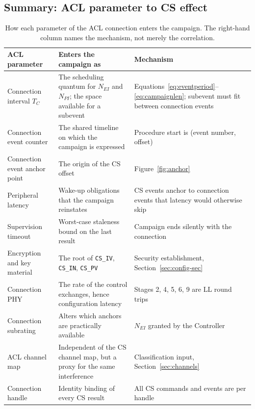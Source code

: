 \documentclass[11pt,a4paper]{article}
\newcommand{\code}[1]{\texttt{\small #1}}
\newcommand{\Tconn}{T_{C}}
\newcommand{\Nei}{N_{EI}}
\newcommand{\Npi}{N_{PI}}
\begin{document}
\subsection{Summary: ACL parameter to CS effect}

\begin{table}[htb]
\caption{How each parameter of the ACL connection enters the campaign. The right-hand column names
the mechanism, not merely the correlation.}
\label{tab:aclmap}
\centering\small
\begin{tabular}{@{}L{34mm}L{50mm}L{52mm}@{}}
\toprule
ACL parameter & Enters the campaign as & Mechanism \\
\midrule
Connection interval $\Tconn$
  & The scheduling quantum for $\Nei$ and $\Npi$; the space available for a subevent
  & Equations~\eqref{eq:eventperiod}--\eqref{eq:campaignlen}; subevent must fit between connection
    events \\
Connection event counter
  & The shared timeline on which the campaign is expressed
  & Procedure start is (event number, offset) \\
Connection event anchor point
  & The origin of the CS offset
  & Figure~\ref{fig:anchor} \\
Peripheral latency
  & Wake-up obligations that the campaign reinstates
  & CS events anchor to connection events that latency would otherwise skip \\
Supervision timeout
  & Worst-case staleness bound on the last result
  & Campaign ends silently with the connection \\
Encryption and key material
  & The root of \code{CS\_IV}, \code{CS\_IN}, \code{CS\_PV}
  & Security establishment, Section~\ref{sec:config-sec} \\
Connection PHY
  & The rate of the control exchanges, hence configuration latency
  & Stages 2, 4, 5, 6, 9 are LL round trips \\
Connection subrating
  & Alters which anchors are practically available
  & $\Nei$ granted by the Controller \\
ACL channel map
  & Independent of the CS channel map, but a proxy for the same interference
  & Classification input, Section~\ref{sec:channels} \\
Connection handle
  & Identity binding of every CS result
  & All CS commands and events are per handle \\
\bottomrule
\end{tabular}
\end{table}
\end{document}
